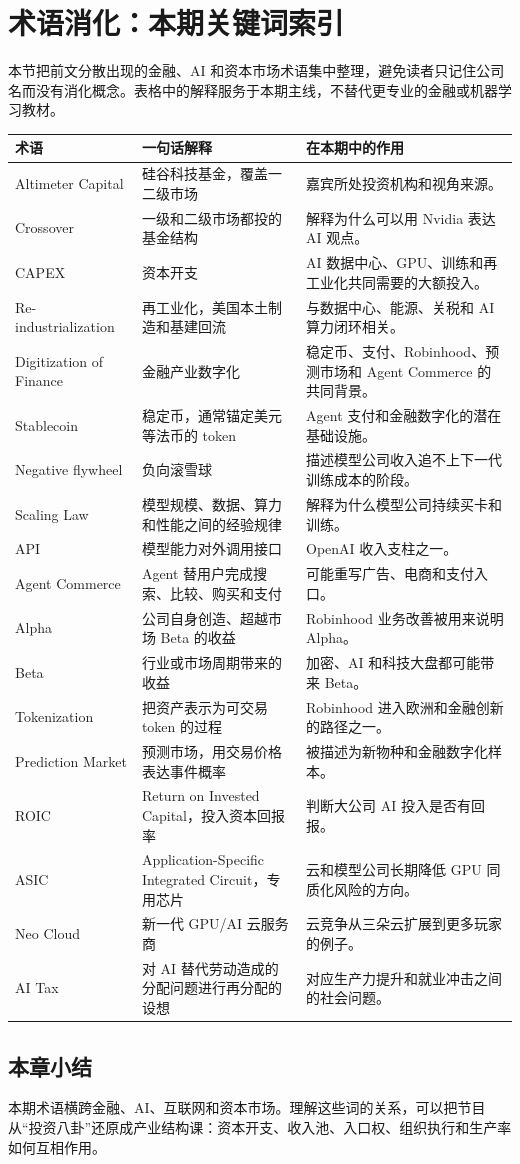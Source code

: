 \section{术语消化：本期关键词索引}

本节把前文分散出现的金融、AI 和资本市场术语集中整理，避免读者只记住公司名而没有消化概念。表格中的解释服务于本期主线，不替代更专业的金融或机器学习教材。

\begin{longtable}{p{}p{}p{}}
\toprule
术语 & 一句话解释 & 在本期中的作用 \\
\midrule
Altimeter Capital & 硅谷科技基金，覆盖一二级市场 & 嘉宾所处投资机构和视角来源。 \\
Crossover & 一级和二级市场都投的基金结构 & 解释为什么可以用 Nvidia 表达 AI 观点。 \\
CAPEX & 资本开支 & AI 数据中心、GPU、训练和再工业化共同需要的大额投入。 \\
Re-industrialization & 再工业化，美国本土制造和基建回流 & 与数据中心、能源、关税和 AI 算力闭环相关。 \\
Digitization of Finance & 金融产业数字化 & 稳定币、支付、Robinhood、预测市场和 Agent Commerce 的共同背景。 \\
Stablecoin & 稳定币，通常锚定美元等法币的 token & Agent 支付和金融数字化的潜在基础设施。 \\
Negative flywheel & 负向滚雪球 & 描述模型公司收入追不上下一代训练成本的阶段。 \\
Scaling Law & 模型规模、数据、算力和性能之间的经验规律 & 解释为什么模型公司持续买卡和训练。 \\
API & 模型能力对外调用接口 & OpenAI 收入支柱之一。 \\
Agent Commerce & Agent 替用户完成搜索、比较、购买和支付 & 可能重写广告、电商和支付入口。 \\
Alpha & 公司自身创造、超越市场 Beta 的收益 & Robinhood 业务改善被用来说明 Alpha。 \\
Beta & 行业或市场周期带来的收益 & 加密、AI 和科技大盘都可能带来 Beta。 \\
Tokenization & 把资产表示为可交易 token 的过程 & Robinhood 进入欧洲和金融创新的路径之一。 \\
Prediction Market & 预测市场，用交易价格表达事件概率 & 被描述为新物种和金融数字化样本。 \\
ROIC & Return on Invested Capital，投入资本回报率 & 判断大公司 AI 投入是否有回报。 \\
ASIC & Application-Specific Integrated Circuit，专用芯片 & 云和模型公司长期降低 GPU 同质化风险的方向。 \\
Neo Cloud & 新一代 GPU/AI 云服务商 & 云竞争从三朵云扩展到更多玩家的例子。 \\
AI Tax & 对 AI 替代劳动造成的分配问题进行再分配的设想 & 对应生产力提升和就业冲击之间的社会问题。 \\
\bottomrule
\end{longtable}

\subsection{本章小结}

本期术语横跨金融、AI、互联网和资本市场。理解这些词的关系，可以把节目从“投资八卦”还原成产业结构课：资本开支、收入池、入口权、组织执行和生产率如何互相作用。

